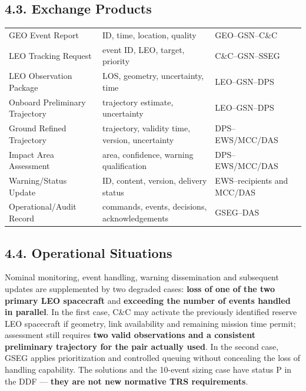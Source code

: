 \subsection{4.3. Exchange Products}\label{principal-exchange-products}

\begingroup{}
\begin{longtable}{|P{0.24}|P{0.47}|P{0.29}|}
\hline{}
 &  & \\ \hline
\endhead
\hline\endlastfoot
GEO Event Report & ID, time, location, quality & GEO–GSN–C\&C\\ \hline
LEO Tracking Request & event ID, LEO, target, priority & C\&C–GSN–SSEG\\ \hline
LEO Observation Package & LOS, geometry, uncertainty, time & LEO–GSN–DPS\\ \hline
Onboard Preliminary Trajectory & trajectory estimate, uncertainty & LEO–GSN–DPS\\ \hline
Ground Refined Trajectory & trajectory, validity time, version, uncertainty & DPS–EWS/\allowbreak{}MCC/\allowbreak{}DAS\\ \hline
Impact Area Assessment & area, confidence, warning qualification & DPS–EWS/\allowbreak{}MCC/\allowbreak{}DAS\\ \hline
Warning/\allowbreak{}Status Update & ID, content, version, delivery status & EWS–recipients and MCC/\allowbreak{}DAS\\ \hline
Operational/\allowbreak{}Audit Record & commands, events, decisions, acknowledgements & GSEG–DAS\\*
\end{longtable}
\endgroup

\subsection{4.4. Operational Situations}\label{operational-situations}

Nominal monitoring, event handling, warning dissemination and subsequent updates are supplemented by two degraded cases: \textbf{loss of one of the two primary LEO spacecraft} and \textbf{exceeding the number of events handled in parallel}. In the first case, C\&C may activate the previously identified reserve LEO spacecraft if geometry, link availability and remaining mission time permit; assessment still requires \textbf{two valid observations and a consistent preliminary trajectory for the pair actually used}. In the second case, GSEG applies prioritization and controlled queuing without concealing the loss of handling capability. The solutions and the 10-event sizing case have status P in the DDF — \textbf{they are not new normative TRS requirements}.
